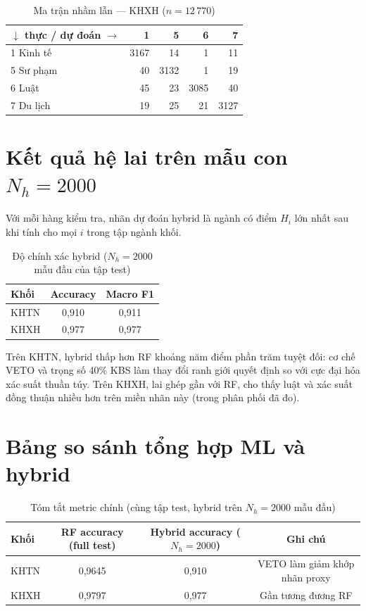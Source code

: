 \begin{table}[htbp]
\centering
\caption{Ma trận nhầm lẫn --- KHXH ($n=12\,770$)}
\label{tab:cmkhxh}
\small
\begin{tabular}{lrrrr}
\toprule
$\downarrow$ thực / dự đoán $\rightarrow$ & 1 & 5 & 6 & 7 \\
\midrule
1 Kinh tế & 3167 & 14 & 1 & 11 \\
5 Sư phạm & 40 & 3132 & 1 & 19 \\
6 Luật & 45 & 23 & 3085 & 40 \\
7 Du lịch & 19 & 25 & 21 & 3127 \\
\bottomrule
\end{tabular}
\end{table}


\section{Kết quả hệ lai trên mẫu con $N_h=2000$}
Với mỗi hàng kiểm tra, nhãn dự đoán hybrid là ngành có điểm $H_i$ lớn nhất sau khi tính cho mọi $i$ trong tập ngành khối.

\begin{table}[htbp]
\centering
\caption{Độ chính xác hybrid ($N_h=2000$ mẫu đầu của tập test)}
\label{tab:hyb}
\begin{tabular}{lcc}
\toprule
Khối & Accuracy & Macro F1 \\
\midrule
KHTN & 0{,}910 & 0{,}911 \\
KHXH & 0{,}977 & 0{,}977 \\
\bottomrule
\end{tabular}
\end{table}

Trên KHTN, hybrid thấp hơn RF khoảng năm điểm phần trăm tuyệt đối: cơ chế VETO và trọng số 40\% KBS làm thay đổi ranh giới quyết định so với cực đại hóa xác suất thuần túy. Trên KHXH, lai ghép gần với RF, cho thấy luật và xác suất đồng thuận nhiều hơn trên miền nhãn này (trong phân phối đã đo).

\section{Bảng so sánh tổng hợp ML và hybrid}
\begin{table}[!htbp]
\centering
\caption{Tóm tắt metric chính (cùng tập test, hybrid trên $N_h=2000$ mẫu đầu)}
\label{tab:comparemlhyb}
\begin{tabular}{lccc}
\toprule
Khối & RF accuracy (full test) & Hybrid accuracy ($N_h{=}2000$) & Ghi chú \\
\midrule
KHTN & 0{,}9645 & 0{,}910 & VETO làm giảm khớp nhãn proxy \\
KHXH & 0{,}9797 & 0{,}977 & Gần tương đương RF \\
\bottomrule
\end{tabular}
\end{table}
\FloatBarrier

